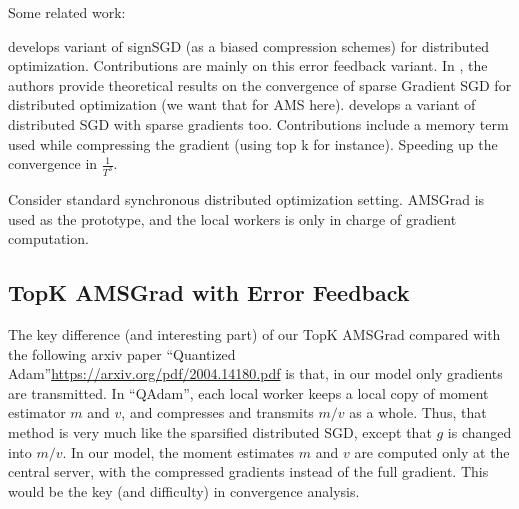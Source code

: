 \documentclass[11pt]{article}
\begin{document}
Some related work:


\citep{karimireddy2019error} develops variant of signSGD (as a biased compression schemes) for distributed optimization. Contributions are mainly on this error feedback variant.
In \citep{shi2019convergence}, the authors provide theoretical results on the convergence of sparse Gradient SGD for distributed optimization (we want that for AMS here).
\citep{stich2018sparsified} develops a variant of distributed SGD with sparse gradients too. Contributions include a memory term used while compressing the gradient (using top k for instance). Speeding up the convergence in $\frac{1}{T^3}$.

Consider standard synchronous distributed optimization setting. AMSGrad is used as the prototype, and the local workers is only in charge of gradient computation.


\subsection{TopK AMSGrad with Error Feedback}




The key difference (and interesting part) of our TopK AMSGrad compared with the following arxiv paper ``Quantized Adam''\url{https://arxiv.org/pdf/2004.14180.pdf} is that, in our model only gradients are transmitted. In ``QAdam'', each local worker keeps a local copy of moment estimator $m$ and $v$, and compresses and transmits $m/v$ as a whole. Thus, that method is very much like the sparsified distributed SGD, except that $g$ is changed into $m/v$. In our model, the moment estimates $m$ and $v$ are computed only at the central server, with the compressed gradients instead of the full gradient. This would be the key (and difficulty) in convergence analysis.
\end{document}
